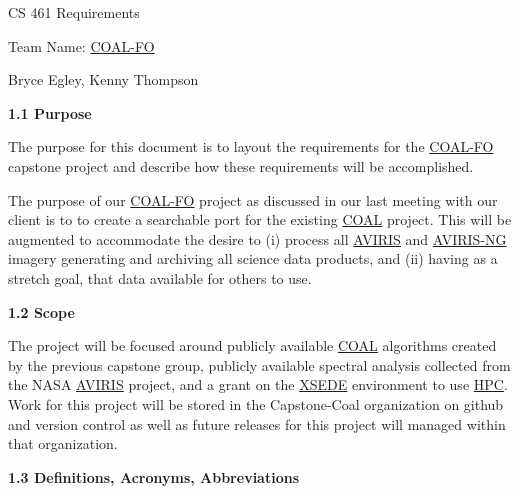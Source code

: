 \documentclass[a4paper,12pt]{article}
\begin{document}
\sloppy

\noindent CS 461 Requirements\newline


\noindent Team Name: \href{http://eecs.oregonstate.edu/capstone/submission/?page=preview\&pid=320}{COAL-FO}\newline


\noindent Bryce Egley, Kenny Thompson\newline


\newline


\noindent \textbf{1.1 Purpose}\newline


\noindent The purpose for this document is to layout the requirements for the \href{http://eecs.oregonstate.edu/capstone/submission/?page=preview\&pid=320}{COAL-FO} capstone project and describe how these requirements will be accomplished. \newline

\noindent The purpose of our \href{http://eecs.oregonstate.edu/capstone/submission/?page=preview\&pid=320}{COAL-FO} project as discussed in our last meeting with our client is to to create a searchable port for the existing \href{https://capstone-coal.github.io/}{COAL} project. This will be augmented to accommodate the desire to (i) process all \href{https://aviris.jpl.nasa.gov/}{AVIRIS} and \href{https://aviris-ng.jpl.nasa.gov/}{AVIRIS-NG} imagery generating and archiving all science data products, and (ii) having as a stretch goal, that data available for others to use. \newline

\noindent \textbf{1.2 Scope}\newline


\noindent The project will be focused around publicly available \href{https://capstone-coal.github.io/}{COAL} algorithms created by the previous capstone group, publicly available spectral analysis collected from the NASA \href{https://aviris.jpl.nasa.gov/}{AVIRIS} project, and a grant on the \href{https://www.xsede.org/}{XSEDE} environment to use \href{https://en.wikipedia.org/wiki/Supercomputer}{HPC}. Work for this project will be stored in the Capstone-Coal organization on github and version control as well as future releases for this project will managed within that organization.\newline


\noindent \textbf{1.3 Definitions, Acronyms, Abbreviations}\newline
\end{document}

